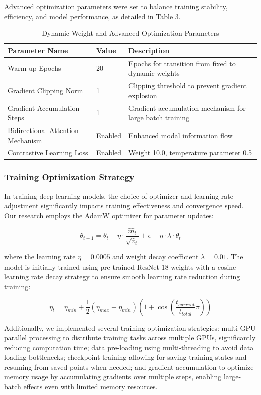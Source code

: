 \documentclass[a4paper,fleqn]{cas-dc}
\begin{document}
Advanced optimization parameters were set to balance training stability, efficiency, and model performance, as detailed in Table 3.

\begin{table}[htbp]
\centering
\caption{Dynamic Weight and Advanced Optimization Parameters}
\begin{tabular}{lll}
\hline
Parameter Name & Value & Description \\
\hline
Warm-up Epochs & 20 & Epochs for transition from fixed to dynamic weights \\
Gradient Clipping Norm & 1 & Clipping threshold to prevent gradient explosion \\
Gradient Accumulation Steps & 1 & Gradient accumulation mechanism for large batch training \\
Bidirectional Attention Mechanism & Enabled & Enhanced modal information flow \\
Contrastive Learning Loss & Enabled & Weight 10.0, temperature parameter 0.5 \\
\hline
\end{tabular}
\label{tab:advanced_params}
\end{table}

\subsubsection{Training Optimization Strategy}
In training deep learning models, the choice of optimizer and learning rate adjustment significantly impacts training effectiveness and convergence speed. Our research employs the AdamW optimizer for parameter updates:

\begin{equation}
\theta_{t+1} = \theta_t - \eta \cdot \frac{\hat{m}_t}{\sqrt{\hat{v}_t}} + \epsilon - \eta \cdot \lambda \cdot \theta_t
\end{equation}

where the learning rate $\eta = 0.0005$ and weight decay coefficient $\lambda = 0.01$. The model is initially trained using pre-trained ResNet-18 weights with a cosine learning rate decay strategy to ensure smooth learning rate reduction during training:

\begin{equation}
\eta_t = \eta_{min} + \frac{1}{2}(\eta_{max} - \eta_{min})(1 + \cos(\frac{t_{current}}{t_{total}}\pi))
\end{equation}

Additionally, we implemented several training optimization strategies: multi-GPU parallel processing to distribute training tasks across multiple GPUs, significantly reducing computation time; data pre-loading using multi-threading to avoid data loading bottlenecks; checkpoint training allowing for saving training states and resuming from saved points when needed; and gradient accumulation to optimize memory usage by accumulating gradients over multiple steps, enabling large-batch effects even with limited memory resources.
\end{document}
